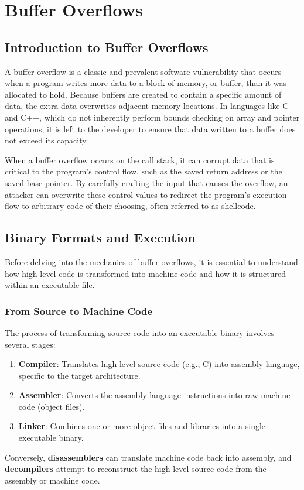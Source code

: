 \chapter{Buffer Overflows}



\section{Introduction to Buffer Overflows}
A buffer overflow is a classic and prevalent software vulnerability that occurs when a program writes more data to a block of memory, or buffer, than it was allocated to hold. Because buffers are created to contain a specific amount of data, the extra data overwrites adjacent memory locations. In languages like C and C++, which do not inherently perform bounds checking on array and pointer operations, it is left to the developer to ensure that data written to a buffer does not exceed its capacity.

When a buffer overflow occurs on the call stack, it can corrupt data that is critical to the program's control flow, such as the saved return address or the saved base pointer. By carefully crafting the input that causes the overflow, an attacker can overwrite these control values to redirect the program's execution flow to arbitrary code of their choosing, often referred to as shellcode.

\section{Binary Formats and Execution}
Before delving into the mechanics of buffer overflows, it is essential to understand how high-level code is transformed into machine code and how it is structured within an executable file.

\subsection{From Source to Machine Code}
The process of transforming source code into an executable binary involves several stages:
\begin{enumerate}
    \item \textbf{Compiler}: Translates high-level source code (e.g., C) into assembly language, specific to the target architecture.
    \item \textbf{Assembler}: Converts the assembly language instructions into raw machine code (object files).
    \item \textbf{Linker}: Combines one or more object files and libraries into a single executable binary.
\end{enumerate}
Conversely, \textbf{disassemblers} can translate machine code back into assembly, and \textbf{decompilers} attempt to reconstruct the high-level source code from the assembly or machine code.

